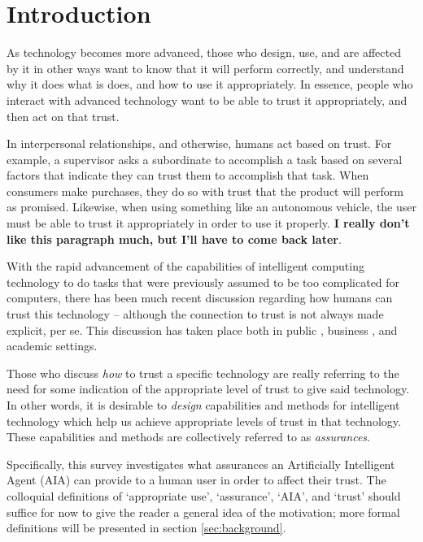 \section{Introduction}
    As technology becomes more advanced, those who design, use, and are affected by it in other ways want to know that it will perform correctly, and understand why it does what is does, and how to use it appropriately. In essence, people who interact with advanced technology want to be able to trust it appropriately, and then act on that trust.

    In interpersonal relationships, and otherwise, humans act based on trust. For example, a supervisor asks a subordinate to accomplish a task based on several factors that indicate they can trust them to accomplish that task. When consumers make purchases, they do so with trust that the product will perform as promised. Likewise, when using something like an autonomous vehicle, the user must be able to trust it appropriately in order to use it properly. \textbf{I really don't like this paragraph much, but I'll have to come back later}.

    With the rapid advancement of the capabilities of intelligent computing technology to do tasks that were previously assumed to be too complicated for computers, there has been much recent discussion regarding how humans can trust this technology -- although the connection to trust is not always made explicit, per se. 
    This discussion has taken place both in public \cite{Spectrum2016-jv,DeSteno2014-cq,Cranz2017-yh,Cassel2017-tn,Danks_undated-sb}, business \cite{Banavar2016-nm, Khosravi2016-ke,Moody2017-vd,Rudnitsky2017-in,Benioff2016-tc}, and academic \cite{Groom2007-bz,Lloyd_undated-bb,Goodrum_2016-fm,Foley2017-qj,Ghahramani2015-yq,Castelvecchi2016-mr} settings.

    Those who discuss \emph{how} to trust a specific technology are really referring to the need for %
    some indication of the appropriate level of trust to give said technology. In other words, it is desirable to \emph{design} capabilities and methods for intelligent technology which help us achieve appropriate levels of trust in that technology. These capabilities and methods are collectively referred to as \emph{assurances}. %
    
Specifically, this survey investigates what assurances an Artificially Intelligent Agent (AIA) can provide to a human user in order to affect their trust. The colloquial definitions of `appropriate use', `assurance', `AIA', and `trust' should suffice for now to give the reader a general idea of the motivation; more formal definitions will be presented in section \ref{sec:background}.

